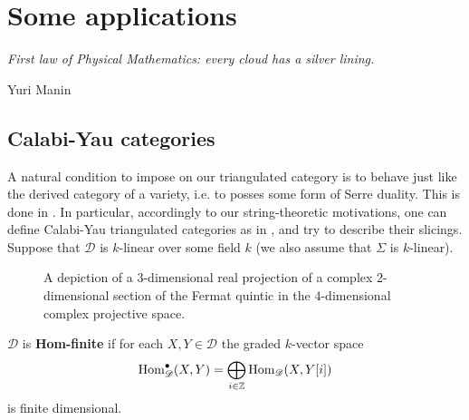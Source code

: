 	 \section{Some applications}
\epigraph{\textit{First law of Physical Mathematics: every cloud has a silver lining.}}{Yuri Manin}
\vspace{10 mm}
\subsection{Calabi-Yau categories}

A natural condition to impose on our triangulated category is to behave just like the derived category of a variety, i.e. to posses some form of Serre duality. This is done in \cite{bon}. In particular, accordingly to our string-theoretic motivations, one can define Calabi-Yau triangulated categories as in \cite{kel}, and try to describe their slicings. \\
Suppose that $\mathscr{D}$ is $k$-linear over some field $k$ (we also assume that $\Sigma$ is $k$-linear). 

\begin{center}
\begin{figure}[h]
\caption{A depiction of a $3$-dimensional real projection of a complex $2$-dimensional section of the Fermat quintic in the $4$-dimensional complex projective space.}
\end{figure}
\end{center}

\begin{defn}
$\mathscr{D}$ is \textbf{Hom-finite} if for each $X,Y \in \mathscr{D}$ the graded $k$-vector space $$\textnormal{Hom}_{\mathscr{D}}^{\bullet}(X,Y)=\bigoplus_{i \in \mathbb{Z}} \textnormal{Hom}_{\mathscr{D}}(X,Y[i])$$ is finite dimensional. 
\end{defn} 

